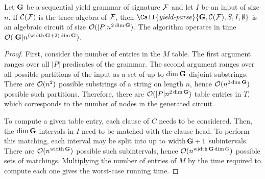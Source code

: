 


\begin{theorem}\label{lem:yield-parse-complexity}
    Let \(\gram\) be a sequential yield grammar of signature \(\algsign\) and let \(I\) be an input of size \(n\).
    If \(\altrace(\algsign)\) is the trace algebra of \(\algsign\), then \(\Call{\emph{yield-parse}}{\gram, \altrace(\algsign), S, I, \emptyset}\) is an algebraic circuit of size \(\bigo(|P| n^{2\dim\gram})\).
    The algorithm operates in time \(\bigo(|\gram| n^{(\width\gram + 2)\dim\gram})\).
\end{theorem}
\begin{proof}
    First, consider the number of entries in the \(M\) table.
    The first argument ranges over all \(|P|\) predicates of the grammar.
    The second argument ranges over all possible partitions of the input as a set of up to \(\dim\gram\) disjoint substrings.
    There are \(\bigo(n^2)\) possible substrings of a string on length \(n\), hence \(\bigo(n^{2\dim\gram})\) possible such partitions.
    Therefore, there are \(\bigo(|P| n^{2\dim\gram})\) table entries in \(T\), which corresponds to the number of nodes in the generated circuit.

    To compute a given table entry, each clause of \(C\) needs to be considered.
    Then, the \(\dim\gram\) intervals in \(I\) need to be matched with the clause head.
    To perform this matching, each interval may be split into up to \(\width\gram + 1\) subintervals.
    There are \(\bigo(n^{\width\gram})\) possible such subintervals, hence \(\bigo(n^{\width\gram\dim G})\) possible sets of matchings.
    Multiplying the number of entries of \(M\) by the time required to compute each one gives the worst-case running time.
\end{proof}

